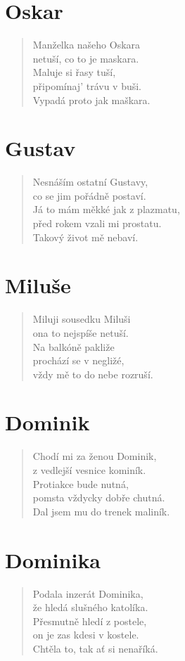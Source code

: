 \section*{Oskar}
\begin{verse}
Manželka našeho Oskara\\
netuší, co to je maskara.\\
Maluje si řasy tuší,\\
připomínaj' trávu v buši.\\
Vypadá proto jak maškara.
\end{verse}

\section*{Gustav}
\begin{verse}
Nesnáším ostatní Gustavy,\\
co se jim pořádně postaví.\\
Já to mám měkké jak z plazmatu,\\
před rokem vzali mi prostatu.\\
Takový život mě nebaví.
\end{verse}

\section*{Miluše}
\begin{verse}
Miluji sousedku Miluši\\
ona to nejspíše netuší.\\
Na balkóně pakliže\\
prochází se v negližé,\\
vždy mě to do nebe rozruší.
\end{verse}

\section*{Dominik}
\begin{verse}
Chodí mi za ženou Dominik,\\
z vedlejší vesnice kominík.\\
Protiakce bude nutná,\\
pomsta vždycky dobře chutná.\\
Dal jsem mu do trenek maliník.
\end{verse}

\section*{Dominika}
\begin{verse}
Podala inzerát Dominika,\\
že hledá slušného katolíka.\\
Přesmutně hledí z postele,\\
on je zas kdesi v kostele.\\
Chtěla to, tak ať si nenaříká.
\end{verse}

